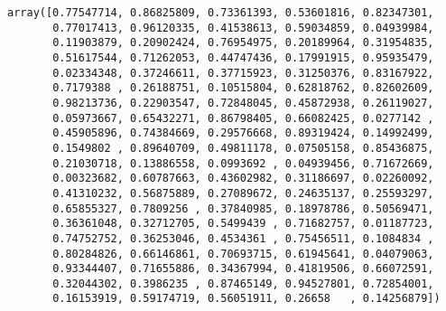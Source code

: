             \begin{tcolorbox}[breakable, size=fbox, boxrule=.5pt, pad at break*=1mm, opacityfill=0]
\begin{Verbatim}[commandchars=\\\{\}]
array([0.77547714, 0.86825809, 0.73361393, 0.53601816, 0.82347301,
       0.77017413, 0.96120335, 0.41538613, 0.59034859, 0.04939984,
       0.11903879, 0.20902424, 0.76954975, 0.20189964, 0.31954835,
       0.51617544, 0.71262053, 0.44747436, 0.17991915, 0.95935479,
       0.02334348, 0.37246611, 0.37715923, 0.31250376, 0.83167922,
       0.7179388 , 0.26188751, 0.10515804, 0.62818762, 0.82602609,
       0.98213736, 0.22903547, 0.72848045, 0.45872938, 0.26119027,
       0.05973667, 0.65432271, 0.86798405, 0.66082425, 0.0277142 ,
       0.45905896, 0.74384669, 0.29576668, 0.89319424, 0.14992499,
       0.1549802 , 0.89640709, 0.49811178, 0.07505158, 0.85436875,
       0.21030718, 0.13886558, 0.0993692 , 0.04939456, 0.71672669,
       0.00323682, 0.60787663, 0.43602982, 0.31186697, 0.02260092,
       0.41310232, 0.56875889, 0.27089672, 0.24635137, 0.25593297,
       0.65855327, 0.7809256 , 0.37840985, 0.18978786, 0.50569471,
       0.36361048, 0.32712705, 0.5499439 , 0.71682757, 0.01187723,
       0.74752752, 0.36253046, 0.4534361 , 0.75456511, 0.1084834 ,
       0.80284826, 0.66146861, 0.70693715, 0.61945641, 0.04079063,
       0.93344407, 0.71655886, 0.34367994, 0.41819506, 0.66072591,
       0.32044302, 0.3986235 , 0.87465149, 0.94527801, 0.72854001,
       0.16153919, 0.59174719, 0.56051911, 0.26658   , 0.14256879])
\end{Verbatim}
\end{tcolorbox}
